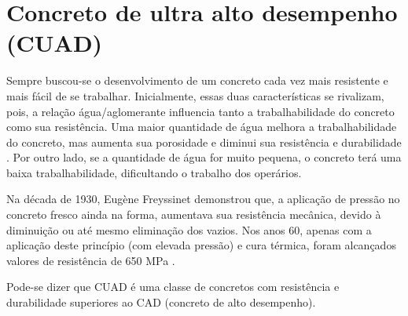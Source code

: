 \chapter{Concreto de ultra alto desempenho ({CUAD})}


Sempre buscou-se o desenvolvimento de um concreto cada vez mais resistente e mais fácil de se trabalhar. Inicialmente, essas duas características se rivalizam, pois, a relação água/aglomerante influencia tanto a trabalhabilidade do concreto como sua resistência. Uma maior quantidade de água melhora a trabalhabilidade do concreto, mas aumenta sua porosidade e diminui sua resistência e durabilidade \cite{Guerra}. Por outro lado, se a quantidade de água for muito pequena, o concreto terá uma baixa trabalhabilidade, dificultando o trabalho dos operários.


Na década de 1930, Eugène Freyssinet demonstrou que, a aplicação de pressão no concreto fresco ainda na forma, aumentava sua resistência mecânica, devido à diminuição ou até mesmo eliminação dos vazios. Nos anos 60, apenas com a aplicação deste princípio (com elevada pressão) e cura térmica, foram alcançados valores de resistência de 650 MPa .



Pode-se dizer que CUAD é uma classe de concretos com resistência e durabilidade superiores ao CAD (concreto de alto desempenho). 

